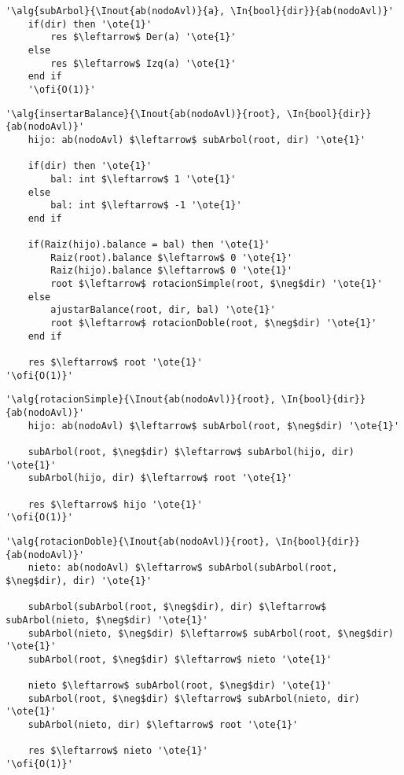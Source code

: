 \begin{lstlisting}[mathescape]
'\alg{subArbol}{\Inout{ab(nodoAvl)}{a}, \In{bool}{dir}}{ab(nodoAvl)}'
	if(dir) then '\ote{1}'
		res $\leftarrow$ Der(a) '\ote{1}'
	else
		res $\leftarrow$ Izq(a) '\ote{1}'
	end if
	'\ofi{O(1)}'
\end{lstlisting}

\begin{lstlisting}[mathescape]
'\alg{insertarBalance}{\Inout{ab(nodoAvl)}{root}, \In{bool}{dir}}{ab(nodoAvl)}'
	hijo: ab(nodoAvl) $\leftarrow$ subArbol(root, dir) '\ote{1}'

	if(dir) then '\ote{1}'
		bal: int $\leftarrow$ 1 '\ote{1}'
	else
		bal: int $\leftarrow$ -1 '\ote{1}'
	end if

	if(Raiz(hijo).balance = bal) then '\ote{1}'
		Raiz(root).balance $\leftarrow$ 0 '\ote{1}'
		Raiz(hijo).balance $\leftarrow$ 0 '\ote{1}'
		root $\leftarrow$ rotacionSimple(root, $\neg$dir) '\ote{1}'
	else
		ajustarBalance(root, dir, bal) '\ote{1}'
		root $\leftarrow$ rotacionDoble(root, $\neg$dir) '\ote{1}'
	end if

	res $\leftarrow$ root '\ote{1}'
'\ofi{O(1)}'
\end{lstlisting}

\begin{lstlisting}[mathescape]
'\alg{rotacionSimple}{\Inout{ab(nodoAvl)}{root}, \In{bool}{dir}}{ab(nodoAvl)}'
	hijo: ab(nodoAvl) $\leftarrow$ subArbol(root, $\neg$dir) '\ote{1}'

	subArbol(root, $\neg$dir) $\leftarrow$ subArbol(hijo, dir) '\ote{1}'
	subArbol(hijo, dir) $\leftarrow$ root '\ote{1}'

	res $\leftarrow$ hijo '\ote{1}'
'\ofi{O(1)}'
\end{lstlisting}

\begin{lstlisting}[mathescape]
'\alg{rotacionDoble}{\Inout{ab(nodoAvl)}{root}, \In{bool}{dir}}{ab(nodoAvl)}'
	nieto: ab(nodoAvl) $\leftarrow$ subArbol(subArbol(root, $\neg$dir), dir) '\ote{1}'

	subArbol(subArbol(root, $\neg$dir), dir) $\leftarrow$ subArbol(nieto, $\neg$dir) '\ote{1}'
	subArbol(nieto, $\neg$dir) $\leftarrow$ subArbol(root, $\neg$dir) '\ote{1}'
	subArbol(root, $\neg$dir) $\leftarrow$ nieto '\ote{1}'

	nieto $\leftarrow$ subArbol(root, $\neg$dir) '\ote{1}'
	subArbol(root, $\neg$dir) $\leftarrow$ subArbol(nieto, dir) '\ote{1}'
	subArbol(nieto, dir) $\leftarrow$ root '\ote{1}'

	res $\leftarrow$ nieto '\ote{1}'
'\ofi{O(1)}'
\end{lstlisting}

